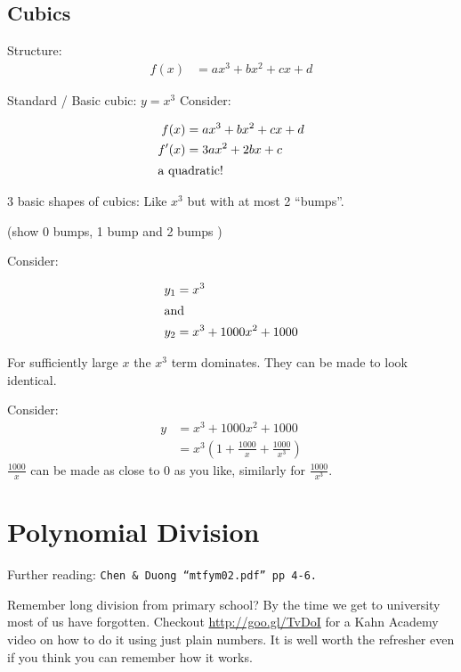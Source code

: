 \subsection{Cubics}
\label{subsec:Cubics}
Structure:
\begin{align}
  f(x) & = ax^3 + bx^2 + cx + d \nonumber
\end{align}

Standard / Basic cubic: $y = x^3$
Consider:

\begin{align}
  f(x) & = ax^3 + bx^2 + cx + d \nonumber \\
  f'(x) &= 3ax^2 + 2bx + c \\
  \intertext{a quadratic!}
\end{align}

3 basic shapes of cubics:
Like $x^3$ but with at most 2 ``bumps''.

(show 0 bumps, 1 bump and 2 bumps )

Consider:

\begin{align}
  y_1 & = x^3 \\
  \intertext{and}
  y_2 & = x^3 + 1000x^2 + 1000
\end{align}


For sufficiently large $x$ the $x^3$ term dominates. They can be made to look
identical.

Consider:
\begin{align}
  y &= x^3 + 1000x^2 + 1000 \\
   &= x^3\left(1 + \frac{1000}{x} + \frac{1000}{x^3}\right)
\end{align}
$\frac{1000}{x}$ can be made as close to 0 as you like, similarly for
$\frac{1000}{x^3}$.

\section{Polynomial Division}
\label{sec:P Polynomial Division}
Further reading: \texttt{Chen \& Duong ``mtfym02.pdf'' pp 4-6.}

Remember long division from primary school? By the time we get to university
most of us have forgotten. Checkout \url{http://goo.gl/TvDoI} for a Kahn Academy
video on how to do it using just plain numbers. It is well worth the refresher
even if you think you can remember how it works.

